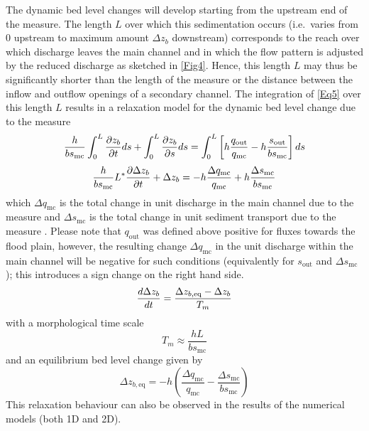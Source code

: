The dynamic bed level changes will develop starting from the upstream end of the measure.
The length $L$ over which this sedimentation occurs (i.e.~varies from 0 upstream to maximum amount $\Delta z_b$ downstream) corresponds to the reach over which discharge leaves the main channel and in which the flow pattern is adjusted by the reduced discharge as sketched in \autoref{Fig4}.
Hence, this length $L$ may thus be significantly shorter than the length of the measure or the distance between the inflow and outflow openings of a secondary channel.
The integration of \autoref{Eq5} over this length $L$ results in a relaxation model for the dynamic bed level change due to the measure
%
\begin{equation}
\frac{h}{b s_\text{mc}} \int_0^L \pdiff{z_b}{t} ds + \int_0^L \pdiff{z_b}{s} ds = \int_0^L \left [ h \frac{q_\text{out}}{q_\text{mc}} - h \frac{s_\text{out}}{b s_\text{mc}} \right ] ds
\label{Eq5a}
\end{equation}
%
\begin{equation}
\frac{h}{b s_\text{mc}} L^* \pdiff{\Delta z_b}{t} + \Delta z_b = - h \frac{\Delta q_\text{mc}}{q_\text{mc}} + h \frac{\Delta s_\text{mc}}{b s_\text{mc}}
\label{Eq5b}
\end{equation}
%
which $\Delta q_\text{mc}$ is the total change in unit discharge in the main channel due to the measure  and $\Delta s_\text{mc}$ is the total change in unit sediment transport due to the measure .
Please note that $q_\text{out}$ was defined above positive for fluxes towards the flood plain, however, the resulting change $\Delta q_\text{mc}$ in the unit discharge within the main channel will be negative for such conditions (equivalently for $s_\text{out}$ and $\Delta s_\text{mc}$); this introduces a sign change on the right hand side.
%
\begin{equation}
\diff{\Delta z_b}{t} = \frac{\Delta z_{b,\text{eq}} - \Delta z_b}{T_m}
\label{Eq5dif}
\end{equation}
%
with a morphological time scale 
%
\begin{equation}
T_m \approx \frac{h L}{b s_\text{mc}}
\label{Eq5T}
\end{equation}
%
and an equilibrium bed level change  given by
%
\begin{equation}
\Delta z_{b,\text{eq}} = -h \left ( \frac{\Delta q_\text{mc}}{q_\text{mc}} - \frac{\Delta s_\text{mc}}{b s_\text{mc}} \right )
\label{Eq6}
\end{equation}
%
This relaxation behaviour can also be observed in the results of the numerical models (both 1D and 2D).

